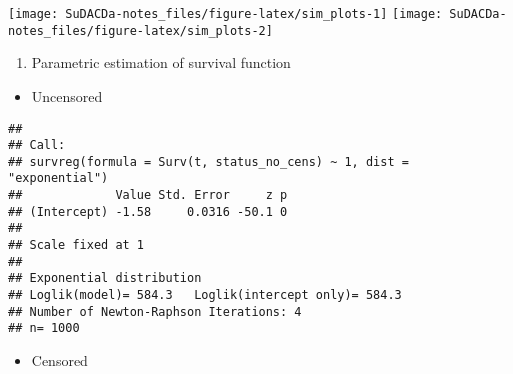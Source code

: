 \documentclass[]{book}
\newenvironment{Shaded}{\begin{snugshade}}{\end{snugshade}}
\newcommand{\KeywordTok}[1]{\textcolor[rgb]{0.13,0.29,0.53}{\textbf{{#1}}}}
\newcommand{\DataTypeTok}[1]{\textcolor[rgb]{0.13,0.29,0.53}{{#1}}}
\newcommand{\DecValTok}[1]{\textcolor[rgb]{0.00,0.00,0.81}{{#1}}}
\newcommand{\StringTok}[1]{\textcolor[rgb]{0.31,0.60,0.02}{{#1}}}
\newcommand{\CommentTok}[1]{\textcolor[rgb]{0.56,0.35,0.01}{\textit{{#1}}}}
\newcommand{\NormalTok}[1]{{#1}}
\providecommand{\tightlist}{%
  \setlength{\itemsep}{0pt}\setlength{\parskip}{0pt}}
\theoremstyle{definition}
\theoremstyle{definition}
\theoremstyle{definition}
\theoremstyle{remark}
\begin{document}
\texttt{[image: SuDACDa-notes\_files/figure-latex/sim\_plots-1]}
\texttt{[image: SuDACDa-notes\_files/figure-latex/sim\_plots-2]}

\begin{enumerate}
\def\labelenumi{\arabic{enumi}.}
\setcounter{enumi}{2}
\tightlist
\item
  Parametric estimation of survival function
\end{enumerate}

\begin{itemize}
\tightlist
\item
  Uncensored
\end{itemize}

\begin{Shaded}
\end{Shaded}

\begin{verbatim}
## 
## Call:
## survreg(formula = Surv(t, status_no_cens) ~ 1, dist = "exponential")
##             Value Std. Error     z p
## (Intercept) -1.58     0.0316 -50.1 0
## 
## Scale fixed at 1 
## 
## Exponential distribution
## Loglik(model)= 584.3   Loglik(intercept only)= 584.3
## Number of Newton-Raphson Iterations: 4 
## n= 1000
\end{verbatim}

\begin{itemize}
\tightlist
\item
  Censored
\end{itemize}

\begin{Shaded}
\end{Shaded}
\end{document}
